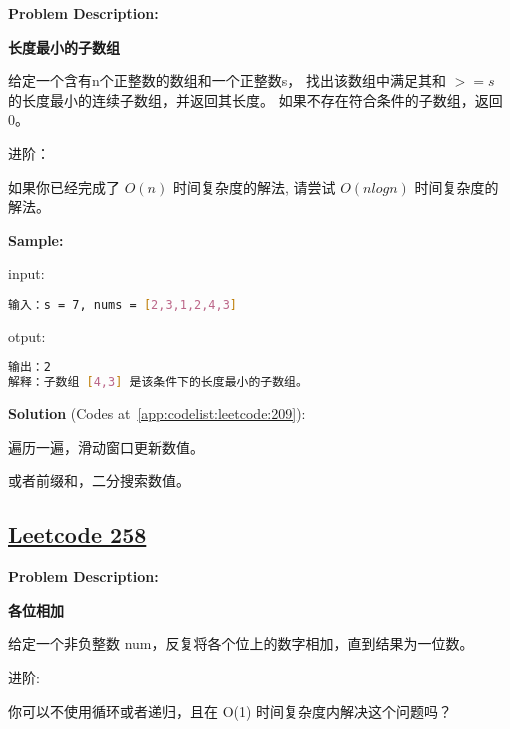 \textbf{Problem Description:}\par

\textbf{长度最小的子数组}\par

给定一个含有n个正整数的数组和一个正整数s，
找出该数组中满足其和 $ >= s $ 的长度最小的连续子数组，并返回其长度。
如果不存在符合条件的子数组，返回 0。\par

进阶：\par

如果你已经完成了 $ O(n) $ 时间复杂度的解法, 请尝试 $ O(n log n) $ 时间复杂度的解法。\par


\textbf{Sample:}\par

input:\par

\begin{lstlisting}[language=bash]
输入：s = 7, nums = [2,3,1,2,4,3]
\end{lstlisting}

otput:\par

\begin{lstlisting}[language=bash]
输出：2
解释：子数组 [4,3] 是该条件下的长度最小的子数组。
\end{lstlisting}

\textbf{Solution }(Codes at~\ref{app:codelist:leetcode:209}):\par

遍历一遍，滑动窗口更新数值。\par

或者前缀和，二分搜索数值。\par



\subsection{\href{https://leetcode-cn.com/}{Leetcode 258}}\label{app:problemlist:leetcode:258}

\textbf{Problem Description:}\par

\textbf{各位相加}\par

给定一个非负整数 num，反复将各个位上的数字相加，直到结果为一位数。\par

进阶:\par
你可以不使用循环或者递归，且在 O(1) 时间复杂度内解决这个问题吗？\par


